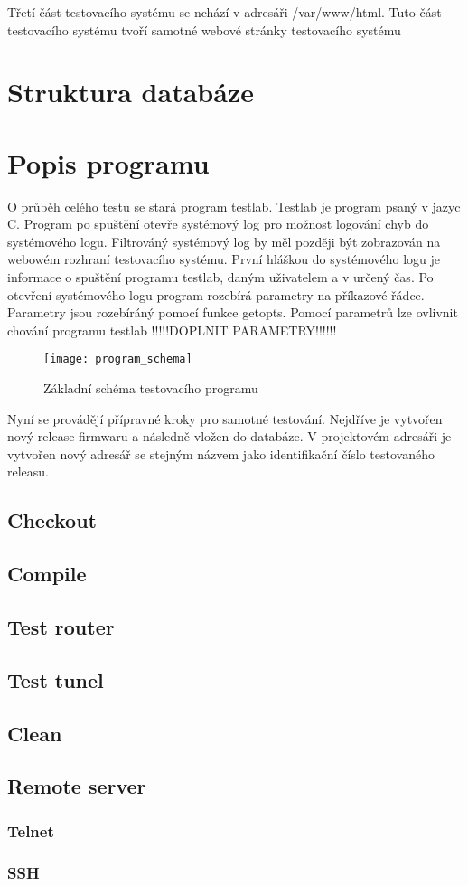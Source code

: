Třetí část testovacího systému se nchází v adresáři /var/www/html. Tuto část testovacího systému tvoří samotné webové stránky testovacího systému

\section{Struktura databáze}

\section{Popis programu}

O průběh celého testu se stará program testlab. Testlab je program psaný v jazyc C. Program po spuštění otevře systémový log pro možnost logování chyb do systémového logu. Filtrováný systémový log by měl později být zobrazován na webowém rozhraní testovacího systému. První hláškou do systémového logu je informace o spuštění programu testlab, daným uživatelem a v určený čas. Po otevření systémového logu program rozebírá parametry na příkazové řádce. Parametry jsou rozebíráný pomocí funkce getopts. Pomocí parametrů lze ovlivnit chování programu testlab !!!!!DOPLNIT PARAMETRY!!!!!!

\begin{figure}[h]
  \centering
  \texttt{[image: program\_schema]}
  \caption{Základní schéma testovacího programu}
  \label{fig:program_schema}
\end{figure}


Nyní se provádějí přípravné kroky pro samotné testování. Nejdříve je vytvořen nový release firmwaru a následně vložen do databáze. V projektovém adresáři je vytvořen nový adresář se stejným názvem jako identifikační číslo testovaného releasu.

\subsection{Checkout}
\subsection{Compile}
\subsection{Test router}
\subsection{Test tunel}
\subsection{Clean}
\subsection{Remote server}
\subsubsection{Telnet}
\subsubsection{SSH}

\endinput
